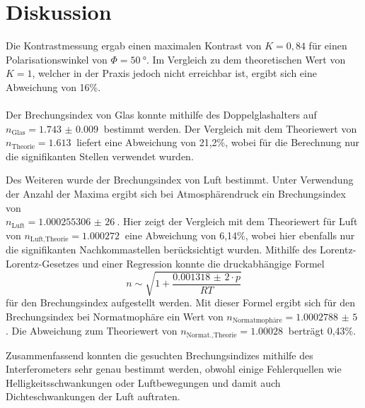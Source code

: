 \section{Diskussion}
\label{sec:Diskussion}
Die Kontrastmessung ergab einen maximalen Kontrast von $K=0,84$ für einen Polarisationswinkel von $\Phi=\SI{50}{\degree}$.
Im Vergleich zu dem theoretischen Wert von $K=1$, welcher in der Praxis jedoch nicht erreichbar ist, ergibt sich eine
Abweichung von 16\%.
\\
\\
Der Brechungsindex von Glas konnte mithilfe des Doppelglashalters auf\\
$n_\text{Glas}=\SI{1.743(9)}{}$ bestimmt werden.
Der Vergleich mit dem Theoriewert von \\
$n_\text{Theorie}=\SI{1,613}{}$ \cite{ns}
liefert eine Abweichung von 21,2\%, wobei für die Berechnung nur die signifikanten Stellen verwendet wurden.

Des Weiteren wurde der Brechungsindex von Luft bestimmt. Unter Verwendung der Anzahl der Maxima ergibt
sich bei Atmosphärendruck ein Brechungsindex von\\
$n_\text{Luft}=\SI{1,000255306(26)}{}$.
Hier zeigt der Vergleich mit dem Theoriewert für Luft von $n_\text{Luft,Theorie}=\SI{1,000272}{}$ \cite{ns}
eine Abweichung von 6,14\%, wobei hier ebenfalls nur die signifikanten Nachkommastellen
berücksichtigt wurden.
Mithilfe des Lorentz-Lorentz-Gesetzes und einer Regression konnte die druckabhängige Formel
\begin{equation}
    n\sim\sqrt{1+\frac{\SI{0,001318(2)}\cdot p}{RT}}
\end{equation}
für den Brechungsindex aufgestellt werden.
Mit dieser Formel ergibt sich für den Brechungsindex bei Normatmophäre ein Wert von $n_\text{Normatmophäre}=\SI{1,0002788(5)}{}$.
Die Abweichung zum Theoriewert von $n_\text{Normat.,Theorie}=\SI{1,00028}{}$ \cite{normath} berträgt 0,43\%.

Zusammenfassend konnten die gesuchten Brechungsindizes mithilfe des Interferometers sehr genau bestimmt werden, obwohl
einige Fehlerquellen wie Helligkeitsschwankungen oder Luftbewegungen und damit auch Dichteschwankungen der Luft auftraten.
